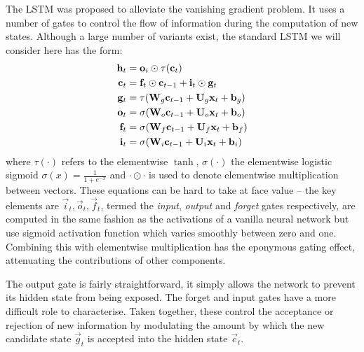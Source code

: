 The LSTM was proposed to alleviate the vanishing gradient problem. It uses a number of gates
to control the flow of information during the computation of new states. Although a large number
of variants exist, the standard LSTM we will consider here has the form: 
\autocite{Hochreiter1997, Graves2013}
\begin{align}\label{eq:LSTM}
	\mathbf{h}_t &= \mathbf{o}_i \odot \tau(\mathbf{c}_t)\\
	\mathbf{c}_t &= \mathbf{f}_t \odot \mathbf{c}_{t-1} + \mathbf{i}_t \odot \mathbf{g}_t\\
	\mathbf{g}_t &= \tau(\mathbf{W}_g \mathbf{c}_{t-1} + \mathbf{U}_g \mathbf{x}_t + \mathbf{b}_g)\\
	\mathbf{o}_t &= \sigma(\mathbf{W}_o \mathbf{c}_{t-1} + \mathbf{U}_o \mathbf{x}_t + \mathbf{b}_o)\\
	\mathbf{f}_t &= \sigma(\mathbf{W}_f \mathbf{c}_{t-1} + \mathbf{U}_f \mathbf{x}_t + \mathbf{b}_f)\\
	\mathbf{i}_t &= \sigma(\mathbf{W}_i \mathbf{c}_{t-1} + \mathbf{U}_i \mathbf{x}_t + \mathbf{b}_i)
\end{align} where \(\tau(\cdot)\) refers to the elementwise \(\tanh\), \(\sigma(\cdot)\) the
elementwise logistic sigmoid \(\sigma(x) = \frac{1}{1 + e^{-x}}\) and \(\cdot \odot \cdot\)
is used to denote elementwise multiplication between vectors. These equations can be hard to take
at face value -- the key elements are \(\vec{i}_t, \vec{o}_t, \vec{f}_t\), termed the
\emph{input}, \emph{output} and \emph{forget} gates respectively, are computed in the same fashion
as the activations of a vanilla neural network but use sigmoid activation function which varies
smoothly between zero and one. Combining this with elementwise multiplication has the eponymous
gating effect, attenuating the contributions of other components. 

The output gate is fairly straightforward, it simply allows the network to prevent its hidden
state from being exposed. The forget and input gates have a more difficult role to characterise.
Taken together, these control the acceptance or rejection of new information by modulating the
amount by which the new candidate state \(\vec{g}_t\) is accepted into the hidden state
\(\vec{c}_t\).

